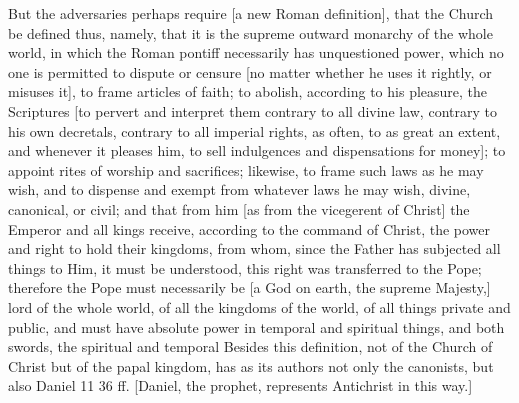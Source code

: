 But the adversaries perhaps require [a new Roman definition], that
the Church be defined thus, namely, that it is the supreme outward
monarchy of the whole world, in which the Roman pontiff necessarily
has unquestioned power, which no one is permitted to dispute or
censure [no matter whether he uses it rightly, or misuses it], to
frame articles of faith; to abolish, according to his pleasure, the
Scriptures [to pervert and interpret them contrary to all divine law,
contrary to his own decretals, contrary to all imperial rights, as
often, to as great an extent, and whenever it pleases him, to sell
indulgences and dispensations for money]; to appoint rites of worship
and sacrifices; likewise, to frame such laws as he may wish, and to
dispense and exempt from whatever laws he may wish, divine, canonical,
or civil; and that from him [as from the vicegerent of Christ] the
Emperor and all kings receive, according to the command of Christ,
the power and right to hold their kingdoms, from whom, since the
Father has subjected all things to Him, it must be understood, this
right was transferred to the Pope; therefore the Pope must
necessarily be [a God on earth, the supreme Majesty,] lord of the
whole world, of all the kingdoms of the world, of all things private
and public, and must have absolute power in temporal and spiritual
things, and both swords, the spiritual and temporal Besides this
definition, not of the Church of Christ but of the papal kingdom, has
as its authors not only the canonists, but also Daniel 11 36 ff.
[Daniel, the prophet, represents Antichrist in this way.]

